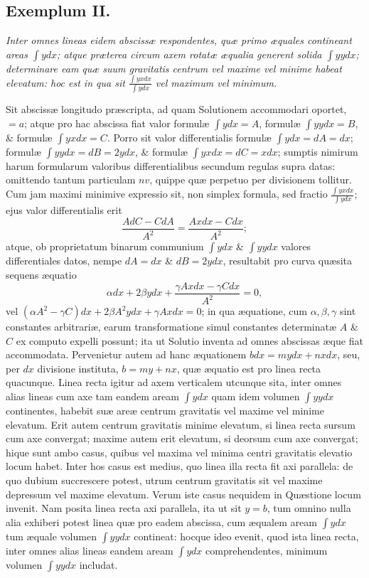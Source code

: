 \subsection*{Exemplum II.}
\textit{Inter omnes lineas eidem abscissæ respondentes, quæ primo æquales contineant areas $\int ydx$; atque præterea circum axem rotatæ æqualia generent solida $\int yydx$; determinare eam quæ suum gravitatis centrum vel maxime vel minime habeat elevatum: hoc est in qua sit $\frac{\int yxdx}{\int ydx}$ vel maximum vel minimum.}

Sit abscissæ longitudo præscripta, ad quam Solutionem accommodari oportet, $=a$; atque pro hac abscissa fiat valor formulæ $\int ydx=A$, formulæ $\int yydx=B$, \& formulæ $\int yxdx=C$. Porro sit valor differentialis formulæ $\int ydx=dA=dx$; formulæ $\int yydx=dB=2ydx$, \& formulæ $\int yxdx=dC=xdx$; sumptis nimirum harum formularum valoribus differentialibus secundum regulas supra datas: omittendo tantum particulam $nv$, quippe quæ perpetuo per divisionem tollitur. Cum jam maximi minimive expressio sit, non simplex formula, sed fractio $\frac{\int yxdx}{\int ydx}$; ejus valor differentialis erit
\[\frac{AdC-CdA}{A^2}=\frac{Axdx-Cdx}{A^2};\]
atque, ob proprietatum binarum communium $\int ydx$ \& $\int yydx$ valores differentiales datos, nempe $dA=dx$ \& $dB=2ydx$, resultabit pro curva quæsita sequens æquatio
\[\alpha dx+2\beta ydx+\frac{\gamma Axdx-\gamma Cdx}{A^2}=0,\]
vel $(\alpha A^2-\gamma C)dx+2\beta A^2ydx+\gamma Axdx=0$; in qua æquatione, cum $\alpha,\beta,\gamma$ sint constantes arbitrariæ, earum transformatione simul constantes determinatæ $A$ \& $C$ ex computo expelli possunt; ita ut Solutio inventa ad omnes abscissas æque fiat accommodata. Pervenietur autem ad hanc æquationem $bdx=mydx+nxdx$, seu, per $dx$ divisione instituta, $b=my+nx$, quæ æquatio est pro linea recta quacunque. Linea recta igitur ad axem verticalem utcunque sita, inter omnes alias lineas cum axe tam eandem aream $\int ydx$ quam idem volumen $\int yydx$ continentes, habebit suæ areæ centrum gravitatis vel maxime vel minime elevatum. Erit autem centrum gravitatis minime elevatum, si linea recta sursum cum axe convergat; maxime autem erit elevatum, si deorsum cum axe convergat; hique sunt ambo casus, quibus vel maxima vel minima centri gravitatis elevatio locum habet. Inter hos casus est medius, quo linea illa recta fit axi parallela: de quo dubium succrescere potest, utrum centrum gravitatis sit vel maxime depressum vel maxime elevatum. Verum iste casus nequidem in Quæstione locum invenit. Nam posita linea recta axi parallela, ita ut sit $y=b$, tum omnino nulla alia exhiberi potest linea quæ pro eadem abscissa, cum æqualem aream $\int ydx$ tum æquale volumen $\int yydx$ contineat: hocque ideo evenit, quod ista linea recta, inter omnes alias lineas eandem aream $\int ydx$ comprehendentes, minimum volumen $\int yydx$ includat.
